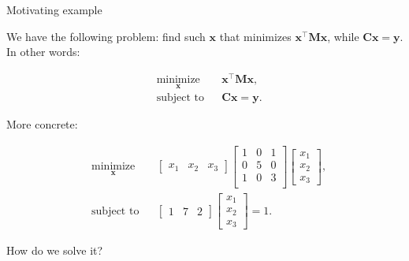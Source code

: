 \documentclass{beamer}
\begin{document}
\begin{frame}{Motivating example}
\begin{flushleft}

We have the following problem: find such $\mathbf x$ that minimizes $\mathbf x^\top \mathbf M \mathbf x$, while $\mathbf C \mathbf x = \mathbf y$. In other words:

\begin{equation} \label{eq:Example1:1}
\begin{aligned}
& \underset{\mathbf  x}{\text{minimize}}
& & \mathbf x^\top \mathbf M \mathbf x, \\
& \text{subject to}
& & \mathbf C \mathbf x = \mathbf y.
\end{aligned}
\end{equation}

More concrete:

\begin{equation} \label{eq:Example1:2}
\begin{aligned}
& \underset{\mathbf  x}{\text{minimize}}
& & \begin{bmatrix} x_1 & x_2 & x_3 \end{bmatrix}
\begin{bmatrix}  
   1 & 0 & 1 \\
   0 & 5 & 0 \\
   1 & 0 & 3 \\
   \end{bmatrix}
\begin{bmatrix} x_1 \\ x_2 \\ x_3 \end{bmatrix}, \\
& \text{subject to}
& & \begin{bmatrix} 1 & 7 & 2 \end{bmatrix}
\begin{bmatrix} x_1 \\ x_2 \\ x_3 \end{bmatrix}
= 1.
\end{aligned}
\end{equation}

How do we solve it?

\end{flushleft}
\end{frame}
\end{document}

